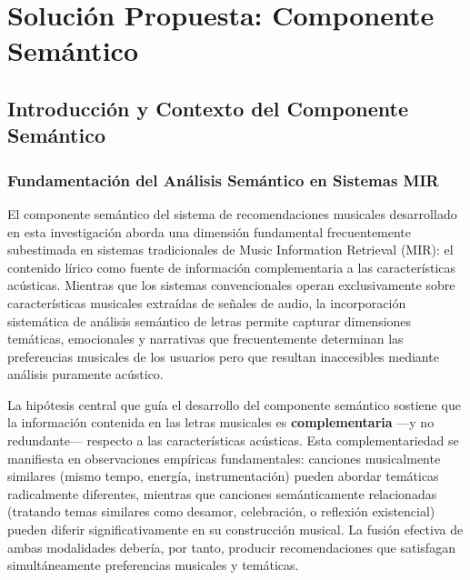 %

\chapter{Solución Propuesta: Componente Semántico}
\label{ch:solucion-semantico}

\section{Introducción y Contexto del Componente Semántico}
\label{sec:intro-semantico}

\subsection{Fundamentación del Análisis Semántico en Sistemas MIR}
\label{subsec:fundamentacion-mir}

El componente semántico del sistema de recomendaciones musicales desarrollado en esta investigación aborda una dimensión fundamental frecuentemente subestimada en sistemas tradicionales de Music Information Retrieval (MIR): el contenido lírico como fuente de información complementaria a las características acústicas. Mientras que los sistemas convencionales operan exclusivamente sobre características musicales extraídas de señales de audio, la incorporación sistemática de análisis semántico de letras permite capturar dimensiones temáticas, emocionales y narrativas que frecuentemente determinan las preferencias musicales de los usuarios pero que resultan inaccesibles mediante análisis puramente acústico.

La hipótesis central que guía el desarrollo del componente semántico sostiene que la información contenida en las letras musicales es \textbf{complementaria} ---y no redundante--- respecto a las características acústicas. Esta complementariedad se manifiesta en observaciones empíricas fundamentales: canciones musicalmente similares (mismo tempo, energía, instrumentación) pueden abordar temáticas radicalmente diferentes, mientras que canciones semánticamente relacionadas (tratando temas similares como desamor, celebración, o reflexión existencial) pueden diferir significativamente en su construcción musical. La fusión efectiva de ambas modalidades debería, por tanto, producir recomendaciones que satisfagan simultáneamente preferencias musicales y temáticas.

